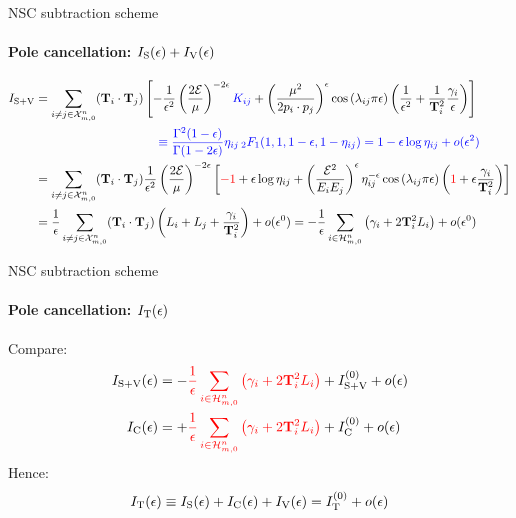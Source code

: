 \begin{frame}{NSC subtraction scheme}
  \framesubtitle{Pole cancellation: $ I_\text{S}(\epsilon) + I_\text{V}(\epsilon) $}

  \small
  \begin{equation*}
    \begin{split}
      \isvo
      & = \sum_{i \neq j \in \fsp{n}{m}} (\cc) \left[ - \frac{1}{\de^2} \left( \frac{2\ema}{\mu} \right)^{-2\de} \textcolor{blue}{K_{ij}} + \left( \frac{\mu^2}{2p_i \cdot p_j} \right)^\de \cos \left( \lambda_{ij} \pi \de \right) \left( \frac{1}{\de^2} + \frac{1}{\tco_i^2} \frac{\gamma_i}{\de} \right) \right] \\
      & \qquad \qquad \qquad \qquad \qquad \textcolor{blue}{\equiv \frac{\Gamma^2(1-\de)}{\Gamma(1-2\de)} \eta_{ij} \,\hyp(1,1,1-\de,1-\eta_{ij}) = 1 - \de \log \eta_{ij} + \smo(\de^2)} \\
      & = \sum_{i \neq j \in \fsp{n}{m}} (\cc) \frac{1}{\de^2} \left( \frac{2\ema}{\mu} \right)^{-2\de} \left[ \textcolor{red}{-1} + \de \log \eta_{ij} + \left( \frac{\ema^2}{E_i E_j} \right)^\de \eta_{ij}^{-\de} \cos \left( \lambda_{ij} \pi \de \right) \left( \textcolor{red}{1} + \de \frac{\gamma_i}{\tco_i^2} \right) \right] \\ %
      & = \frac{1}{\de} \sum_{i \neq j \in \fsp{n}{m}} (\cc) \left( \leg_i + \leg_j + \frac{\gamma_i}{\tco_i^2} \right) + \smo(\de^0) = - \frac{1}{\de} \sum_{i \in \prt{n}{m}} \left( \gamma_i + 2 \tco_i^2 \leg_i \right) + \smo(\de^0)
    \end{split}
  \end{equation*}

\end{frame}


\begin{frame}{NSC subtraction scheme}
  \framesubtitle{Pole cancellation: $ I_\text{T}(\epsilon) $}

  Compare:
  \begin{equation*}
    \begin{split}
      I_{\text{S}+\text{V}}(\epsilon) = - & \textcolor{red}{\frac{1}{\epsilon} \sum_{i \in \mathcal{H}^{n}_{m,0}} \left( \gamma_i + 2 \mathbf{T}_i^2 L_i \right)} + I_{\text{S}+\text{V}}^{(0)} + o(\epsilon) \\
      I_\text{C}(\epsilon) = + & \textcolor{red}{\frac{1}{\epsilon} \sum_{i \in \mathcal{H}^{n}_{m,0}} \left( \gamma_i + 2 \mathbf{T}_i^2 L_i \right)} + I_\text{C}^{(0)} + o(\epsilon)
    \end{split}
  \end{equation*}
  Hence:
  \begin{equation*}
    I_\text{T}(\epsilon) \equiv I_\text{S}(\epsilon) + I_\text{C}(\epsilon) + I_\text{V}(\epsilon) = I_\text{T}^{(0)} + o(\epsilon)
  \end{equation*}

\end{frame}

